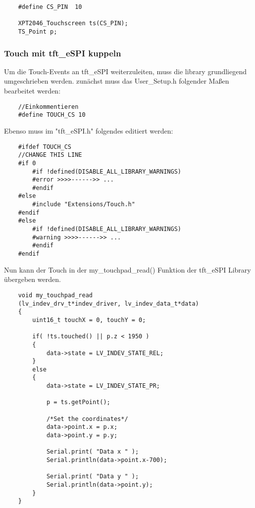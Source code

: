             \begin{lstlisting}
    #define CS_PIN  10

    XPT2046_Touchscreen ts(CS_PIN);
    TS_Point p;
            \end{lstlisting}

            \subsubsection{Touch mit tft\_eSPI kuppeln} \label{touch_to_tft}
            Um die Touch-Events an tft\_eSPI weiterzuleiten, muss die library grundliegend \\ 
            umgeschrieben werden.
            zunächst muss das User\_Setup.h folgender Maßen bearbeitet werden:

            \begin{lstlisting}
    //Einkommentieren
    #define TOUCH_CS 10 
            \end{lstlisting}

            
            \begin{minipage}{\linewidth}
            Ebenso muss im "tft\_eSPI.h" folgendes editiert werden:
            \begin{lstlisting}   
    #ifdef TOUCH_CS
    //CHANGE THIS LINE
    #if 0
        #if !defined(DISABLE_ALL_LIBRARY_WARNINGS)
        #error >>>>------>> ...
        #endif
    #else
        #include "Extensions/Touch.h"
    #endif
    #else
        #if !defined(DISABLE_ALL_LIBRARY_WARNINGS)
        #warning >>>>------>> ...
        #endif
    #endif
            \end{lstlisting}\end{minipage}
            
            

            \begin{minipage}{\linewidth}
            Nun kann der Touch in der my\_touchpad\_read() Funktion der tft\_eSPI Library
            übergeben werden.
            \begin{lstlisting}
    void my_touchpad_read
    (lv_indev_drv_t*indev_driver, lv_indev_data_t*data)
    {
        uint16_t touchX = 0, touchY = 0;
    
        if( !ts.touched() || p.z < 1950 )
        {
            data->state = LV_INDEV_STATE_REL;
        }
        else
        {
            data->state = LV_INDEV_STATE_PR;
    
            p = ts.getPoint();

            /*Set the coordinates*/
            data->point.x = p.x;
            data->point.y = p.y;
    
            Serial.print( "Data x " );
            Serial.println(data->point.x-700);
    
            Serial.print( "Data y " );
            Serial.println(data->point.y);
        }
    }
            \end{lstlisting}\end{minipage}

